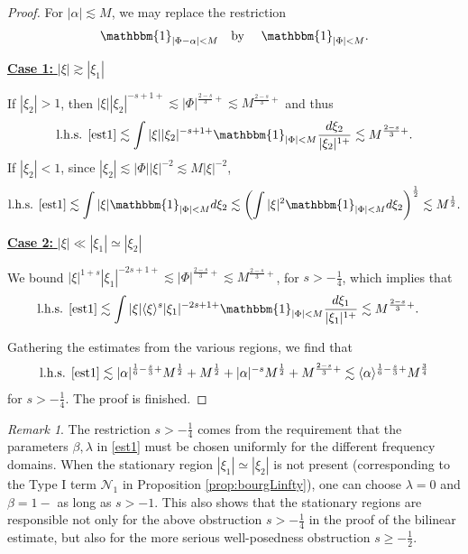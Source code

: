 \documentclass[a4paper,
11pt,  reqno]{amsart}
\newcommand{\fia}{\mathbbm{1}_{|\Phi-\alpha|<M}}
\newcommand{\jap}[1]{\langle #1 \rangle}
\newcommand{\5}{\textup{V}}
\newcommand{\noi}{\noindent}
\newcommand{\les}{\lesssim}
\theoremstyle{remark}
\newtheorem{remark}[theorem]{Remark}
\numberwithin{equation}{section}
\numberwithin{theorem}{section}
\newcommand{\Ncal}{\mathcal{N}}
\begin{document}
\begin{proof}
\smallskip

For $|\alpha|\lesssim M$, we may replace the restriction
$$
\fia \quad \mbox{by }\quad \mathbbm{1}_{|\Phi|<M}.
$$



\smallskip 
\noi
\underline{\textbf{Case 1:} $|\xi|\gtrsim |\xi_1|$} 

If $|\xi_2|>1$, then
$
|\xi||\xi_2|^{-s+1+}\lesssim |\Phi|^{\frac{2-s}{3}+} \lesssim M^{\frac{2-s}{3}+}
$
and thus
\begin{align}
\text{l.h.s. \eqref{est1}}
\les \int |\xi||\xi_2|^{-s+1+}\mathbbm{1}_{|\Phi|<M}\frac{d\xi_2}{|\xi_2|^{1+}}\lesssim M^{\frac{2-s}{3}+}.
\end{align}
If $|\xi_2|<1$, since $|\xi_2|\lesssim |\Phi||\xi|^{-2}\lesssim M|\xi|^{-2}$,
\begin{align}
\text{l.h.s. \eqref{est1}}
\les \int |\xi|\mathbbm{1}_{|\Phi|<M}d\xi_2\lesssim \left(\int |\xi|^2\mathbbm{1}_{|\Phi|<M} d\xi_2\right)^\frac12\lesssim M^{\frac12}.
\end{align}


\smallskip\noi
\underline{\textbf{Case 2:} $|\xi|\ll |\xi_1|\simeq |\xi_2|$} 

We bound
$ |\xi|^{1+s}|\xi_1|^{-2s+1+}\lesssim |\Phi|^{\frac{2-s}{3}+}\lesssim M^{\frac{2-s}{3}+}
$, 
for $s>-\frac14$, 
which implies that
\begin{align}
\text{l.h.s. \eqref{est1}}
&\les \int |\xi|\jap{\xi}^s|\xi_1|^{-2s+1+}\mathbbm{1}_{|\Phi|<M}\frac{d\xi_1}{|\xi_1|^{1+}}\lesssim  M^{\frac{2-s}{3}+}.
\end{align}

\medskip

Gathering the estimates from the various regions, we find that
\begin{align}
\text{l.h.s. \eqref{est1}}
\lesssim |\alpha|^{\frac16-\frac s3+}M^{\frac12} + M^{\frac12} + |\alpha|^{-s}M^{\frac12} +  M^{\frac{2-s}{3}+} \lesssim \jap{\alpha}^{\frac16-\frac s3+}M^{\frac34}
\end{align}
for $s>-\frac14$. The proof is finished.\qedhere



\end{proof}



\begin{remark}
    The restriction $s>-\frac14$ comes from the requirement that the parameters $\beta,\lambda$ in \eqref{est1} must be chosen uniformly for the different frequency domains. When the stationary region $|\xi_1|\simeq |\xi_2|$ is not present (corresponding to the Type I term $\Ncal_1$ in Proposition \ref{prop:bourgLinfty}), one can choose $\lambda=0$ and $\beta=1-$ as long as $s>-1$.
    This also shows that the stationary regions are responsible not only for the above obstruction $s>-\frac14$ in the proof of the bilinear estimate, but also for the more serious well-posedness obstruction $s\ge -\frac12$.

\end{remark}







\end{document}
